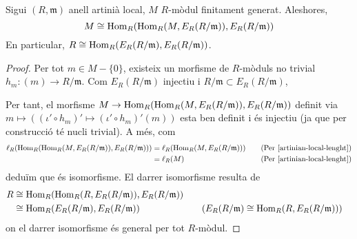 \begin{corolari}\label{artinian-local-isomorphism}
    Sigui $(R,\mathfrak{m})$ anell artinià local, $M$ $R$-mòdul finitament generat. Aleshores,
    \begin{equation*}
        M\cong\operatorname{Hom}_{R}(\operatorname{Hom}_{R}(M,E_{R}(R/\mathfrak{m})),E_{R}(R/\mathfrak{m}))
    \end{equation*}
    En particular, $R\cong\operatorname{Hom}_{R}(E_{R}(R/\mathfrak{m}),E_{R}(R/\mathfrak{m}))$.
    \begin{proof}
        Per tot $m\in M-\{0\}$, existeix un morfisme de $R$-mòduls no trivial $h_{m}:(m)\rightarrow R/\mathfrak{m}$. Com $E_{R}(R/\mathfrak{m})$ injectiu i $R/\mathfrak{m}\subset E_{R}(R/\mathfrak{m})$,
        \begin{center}
        \end{center}
        Per tant, el morfisme $M\rightarrow\operatorname{Hom}_{R}(\operatorname{Hom}_{R}(M,E_{R}(R/\mathfrak{m})),E_{R}(R/\mathfrak{m}))$ definit via $m\mapsto((\iota'\circ h_{m})'\mapsto(\iota'\circ h_{m})'(m))$ esta ben definit i és injectiu (ja que per construcció té nucli trivial). A més, com
        \begin{align*}
            \ell_{R}(\operatorname{Hom}_{R}(\operatorname{Hom}_{R}(M,E_{R}(R/\mathfrak{m})),E_{R}(R/\mathfrak{m})))
            &=\ell_{R}(\operatorname{Hom}_{R}(M,E_{R}(R/\mathfrak{m})))
            &\quad&\textrm{(Per \ref{artinian-local-lenght})}\\
            &=\ell_{R}(M)
            &\quad&\textrm{(Per \ref{artinian-local-lenght})}
        \end{align*}
        deduïm que és isomorfisme. El darrer isomorfisme resulta de
        \begin{align*}
            R
            &\cong\operatorname{Hom}_{R}(\operatorname{Hom}_{R}(R,E_{R}(R/\mathfrak{m})),E_{R}(R/\mathfrak{m}))\\
            &\cong
            \operatorname{Hom}_{R}(E_{R}(R/\mathfrak{m}),E_{R}(R/\mathfrak{m}))
            &\quad&\textrm{($E_{R}(R/\mathfrak{m})\cong\operatorname{Hom}_{R}(R,E_{R}(R/\mathfrak{m}))$)}
        \end{align*}
        on el darrer isomorfisme és general per tot $R$-mòdul.
    \end{proof}
\end{corolari}
